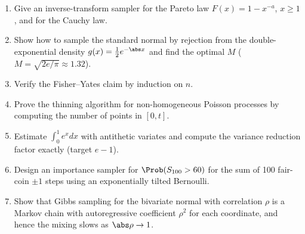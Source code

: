 \begin{enumerate}
\item Give an inverse-transform sampler for the Pareto law $F(x)=1-x^{-a}$, $x\ge1$, and for the
Cauchy law.
\item Show how to sample the standard normal by rejection from the double-exponential density
$g(x)=\tfrac12e^{-\abs x}$ and find the optimal $M$ ($M=\sqrt{2e/\pi}\approx1.32$).
\item Verify the Fisher--Yates claim by induction on $n$.
\item Prove the thinning algorithm for non-homogeneous Poisson processes by computing the number of
points in $[0,t]$.
\item Estimate $\int_0^1e^{x}dx$ with antithetic variates and compute the variance reduction factor
exactly (target $e-1$).
\item Design an importance sampler for $\Prob(S_{100}>60)$ for the sum of 100 fair-coin $\pm1$ steps
using an exponentially tilted Bernoulli.
\item Show that Gibbs sampling for the bivariate normal with correlation $\rho$ is a Markov chain with
autoregressive coefficient $\rho^2$ for each coordinate, and hence the mixing slows as $\abs\rho\to1$.
\end{enumerate}
